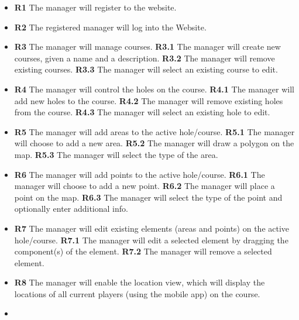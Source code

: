 \documentclass{article}
\begin{document}
    \begin{itemize}
        \item
            \textbf{R1} The manager will register to the website.
        \item
            \textbf{R2} The registered manager will log into the Website.
        \item
            \textbf{R3} The manager will manage courses.
            \subitem \textbf{R3.1} The manager will create new courses, given a
            name and a description.
            \subitem \textbf{R3.2} The manager will remove existing courses.
            \subitem \textbf{R3.3} The manager will select an existing course
            to edit.
        \item
            \textbf{R4} The manager will control the holes on the course.
            \subitem \textbf{R4.1} The manager will add new holes to the
            course.
            \subitem \textbf{R4.2} The manager will remove existing holes from
            the course.
            \subitem \textbf{R4.3} The manager will select an existing hole to
            edit.
        \item
            \textbf{R5} The manager will add areas to the active hole/course.
            \subitem \textbf{R5.1} The manager will choose to add a new area.
            \subitem \textbf{R5.2} The manager will draw a polygon on the map.
            \subitem \textbf{R5.3} The manager will select the type of the
            area.
        \item
            \textbf{R6} The manager will add points to the active hole/course.
            \subitem \textbf{R6.1} The manager will choose to add a new point.
            \subitem \textbf{R6.2} The manager will place a point on the map.
            \subitem \textbf{R6.3} The manager will select the type of the
            point and optionally enter additional info.
        \item
            \textbf{R7} The manager will edit existing elements (areas and
            points) on the active hole/course.
            \subitem \textbf{R7.1} The manager will edit a selected element by
            dragging the component(s) of the element.
            \subitem \textbf{R7.2} The manager will remove a selected element.
        \item
            \textbf{R8} The manager will enable the location view, which will
            display the locations of all current players (using the mobile app)
            on the course.
        \item

\end{itemize}
\end{document}
